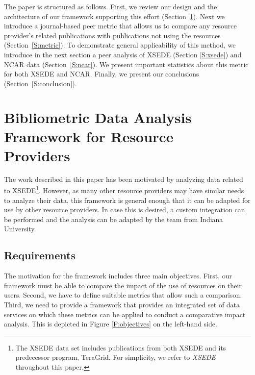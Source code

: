 \documentclass{sig-alternate}
\begin{document}
The paper is structured as follows. First, we review our design and the architecture of our framework supporting this effort (Section~\ref{S:framework}). Next we introduce a journal-based peer metric that allows us to compare any resource provider's related publications with publications not using the resources (Section~\ref{S:metric}).  To demonstrate general applicability of this method, we introduce in the next section a peer analysis of XSEDE (Section \ref{S:xsede}) and NCAR data (Section~\ref{S:ncar}). We present important statistics about this metric for both XSEDE and NCAR. Finally, we present our conclusions (Section~\ref{S:conclusion}).

\section{Bibliometric Data Analysis \\Framework for Resource
  \\Providers} \label{S:framework}

The work described in this paper has been motivated by analyzing data related to XSEDE\footnote{The XSEDE data set includes publications from both XSEDE and its predecessor program, TeraGrid. For simplicity, we refer to {\em XSEDE} throughout this paper.}. However, as many other resource providers may have similar needs to analyze their data, this framework is general enough that it can be adapted for use by other resource providers. In case this is desired, a custom integration can be performed and the analysis can be adapted by the team from Indiana University. 


\subsection{Requirements}

The motivation for the framework includes three main objectives.  First, our framework must be able to compare the impact of the use of resources on their users. Second, we have to define suitable metrics that allow such a comparison. Third, we need to provide a framework that provides an integrated set of data services on which these metrics can be applied to conduct a comparative impact analysis. This is depicted in Figure \ref{F:objectives} on the left-hand side.
\end{document}
